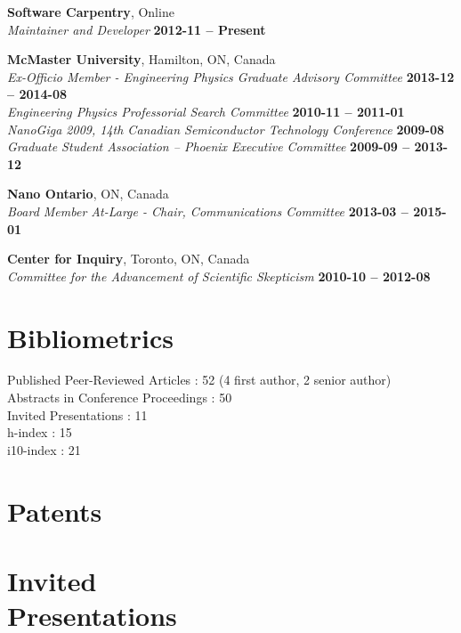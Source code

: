 \documentclass[margin1,line,canadian]{resume}
\begin{document}
\begin{resume}
\textbf{Software Carpentry}, Online\\%
\textsl{Maintainer and Developer} \hfill \textbf{2012-11 -- Present}

\textbf{McMaster University}, Hamilton, ON, Canada\\%
\textsl{Ex-Officio Member - Engineering Physics Graduate Advisory Committee} \hfill \textbf{2013-12 -- 2014-08}\\
\textsl{Engineering Physics Professorial Search Committee} \hfill \textbf{2010-11 -- 2011-01}\\
\textsl{NanoGiga 2009, 14th Canadian Semiconductor Technology Conference} \hfill \textbf{2009-08}\\
\textsl{Graduate Student Association -- Phoenix Executive Committee} \hfill \textbf{2009-09 -- 2013-12}

\textbf{Nano Ontario}, ON, Canada\\%
\textsl{Board Member At-Large - Chair, Communications Committee} \hfill \textbf{2013-03 -- 2015-01}

\textbf{Center for Inquiry}, Toronto, ON, Canada\\%
\textsl{Committee for the Advancement of Scientific Skepticism} \hfill \textbf{2010-10 -- 2012-08}\\

 \section{\mysidestyle Bibliometrics}
 Published Peer-Reviewed Articles : 52 (4 first author, 2 senior author)\\
 Abstracts in Conference Proceedings : 50\\
 Invited Presentations : 11\\
 h-index : 15\\
 i10-index : 21\\

 \section{\mysidestyle Patents}
 \begin{refsection}
  \newrefcontext[sorting=ymdnt]
  \nocite{*}
  \printbibliography[heading=none]
 \end{refsection}

 \section{\mysidestyle Invited\\Presentations}
 \begin{refsection}
  \newrefcontext[sorting=ymdnt]
  \nocite{*}
  \printbibliography[heading=none]
 \end{refsection}


\end{resume}
\end{document}
